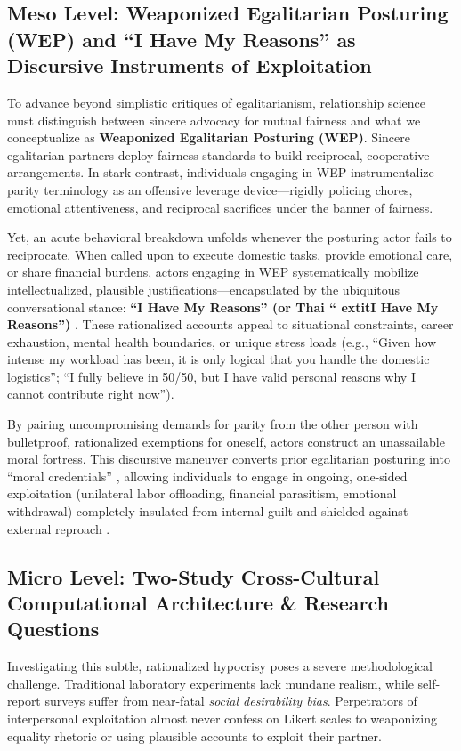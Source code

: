 \subsection{Meso Level: Weaponized Egalitarian Posturing (WEP) and ``I Have My Reasons'' as Discursive Instruments of Exploitation}
To advance beyond simplistic critiques of egalitarianism, relationship science must distinguish between sincere advocacy for mutual fairness and what we conceptualize as \textbf{Weaponized Egalitarian Posturing (WEP)}. Sincere egalitarian partners deploy fairness standards to build reciprocal, cooperative arrangements. In stark contrast, individuals engaging in WEP instrumentalize parity terminology as an offensive leverage device—rigidly policing chores, emotional attentiveness, and reciprocal sacrifices under the banner of fairness.

Yet, an acute behavioral breakdown unfolds whenever the posturing actor fails to reciprocate. When called upon to execute domestic tasks, provide emotional care, or share financial burdens, actors engaging in WEP systematically mobilize intellectualized, plausible justifications—encapsulated by the ubiquitous conversational stance: \textbf{``I Have My Reasons'' (or Thai ``	extit{I Have My Reasons''})} \citep{scott1968accounts,edwards1992discursive}. These rationalized accounts appeal to situational constraints, career exhaustion, mental health boundaries, or unique stress loads (e.g., ``Given how intense my workload has been, it is only logical that you handle the domestic logistics''; ``I fully believe in 50/50, but I have valid personal reasons why I cannot contribute right now'').

By pairing uncompromising demands for parity from the other person with bulletproof, rationalized exemptions for oneself, actors construct an unassailable moral fortress. This discursive maneuver converts prior egalitarian posturing into ``moral credentials'' \citep{monin2001moral,merritt2010moral}, allowing individuals to engage in ongoing, one-sided exploitation (unilateral labor offloading, financial parasitism, emotional withdrawal) completely insulated from internal guilt and shielded against external reproach \citep{bandura1999moral,bates2024virtuous}.

\subsection{Micro Level: Two-Study Cross-Cultural Computational Architecture \& Research Questions}
Investigating this subtle, rationalized hypocrisy poses a severe methodological challenge. Traditional laboratory experiments lack mundane realism, while self-report surveys suffer from near-fatal \textit{social desirability bias}. Perpetrators of interpersonal exploitation almost never confess on Likert scales to weaponizing equality rhetoric or using plausible accounts to exploit their partner. 

